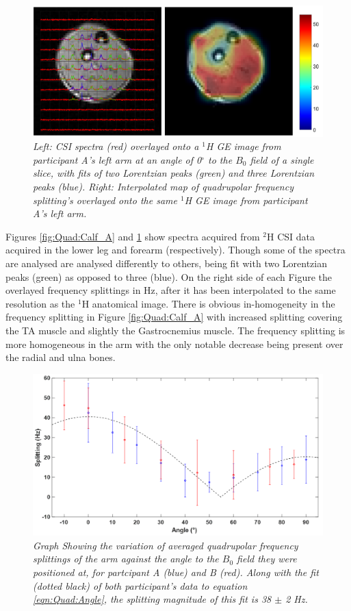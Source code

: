 \begin{figure}
    \centering
    \includegraphics[width=1\textwidth]{Figures/Quad/Arm_A.png}
    \caption{\textit{Left: \ac{CSI} spectra (red) overlayed onto a $^1$H \ac{GE} image from participant A's left arm at an angle of 0$^\circ$ to the $B_0$ field of a single slice, with fits of two Lorentzian peaks (green) and three Lorentzian peaks (blue). Right: Interpolated map of quadrupolar frequency splitting's overlayed onto the same $^1$H GE image from participant A's left arm.}}
    \label{fig:Quad:Arm_A}
\end{figure}

Figures \ref{fig:Quad:Calf_A} and \ref{fig:Quad:Arm_A} show spectra acquired from $^2$H \ac{CSI} data acquired in the lower leg and forearm (respectively). Though some of the spectra are analysed are analysed differently to others, being fit with two Lorentzian peaks (green) as opposed to three (blue). On the right side of each Figure the overlayed frequency splittings in Hz, after it has been interpolated to the same resolution as the $^1$H anatomical image. There is obvious in-homogeneity in the frequency splitting in Figure \ref{fig:Quad:Calf_A} with increased splitting covering the \ac{TA} muscle and slightly the Gastrocnemius muscle. The frequency splitting is more homogeneous in the arm with the only notable decrease being present over the radial and ulna bones.

\begin{figure}
    \centering
    \includegraphics[width=1\textwidth]{Figures/Quad/Split_Angle_1.png}
    \caption{\textit{Graph Showing the variation of averaged quadrupolar frequency splittings of the arm against the angle to the $B_0$ field they were positioned at, for partcipant A (blue) and B (red). Along with the fit (dotted black) of both participant's data to equation \ref{eqn:Quad:Angle}, the splitting magnitude of this fit is 38 $\pm$ 2 Hz.}}
    \label{fig:Quad:Split_Angle_1}
\end{figure}

